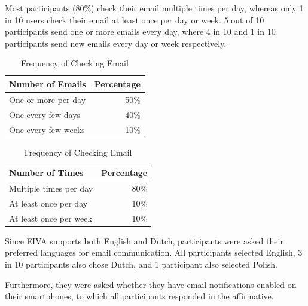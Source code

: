 \documentclass{article}
\begin{document}
Most participants (80\%) check their email multiple times per day, whereas only 1 in 10 users check their email at least once per day or week. 5 out of 10 participants send one or more emails every day, where 4 in 10 and 1 in 10 participants send new emails every day or week respectively.

\begin{table}[!htb]
    \begin{minipage}{.5\linewidth}
   	 \caption{Frequency of Emails Sent}
      \centering
        \begin{tabular}{lr}
	        \hline
            \textbf{Number of Emails} & \textbf{Percentage} \\
            \hline
            One or more per day & 50\% \\
            One every few days & 40\% \\
            One every few weeks & 10\% \\
            \hline
        \end{tabular}
    \end{minipage}%
    \hspace{.1cm}
    \begin{minipage}{.5\linewidth}
      \centering
	    \caption{Frequency of Checking Email}
        \begin{tabular}{lr}
	        \hline
            \textbf{Number of Times} & \textbf{Percentage} \\
            \hline
            Multiple times per day & 80\% \\
            At least once per day & 10\% \\
            At least once per week & 10\% \\
            \hline
        \end{tabular}
    \end{minipage} 
\end{table}

Since EIVA supports both English and Dutch, participants were asked their preferred languages for email communication. All participants selected English, 3 in 10 participants also chose Dutch, and 1 participant also selected Polish.

Furthermore, they were asked whether they have email notifications enabled on their smartphones, to which all participants responded in the affirmative.
\end{document}
